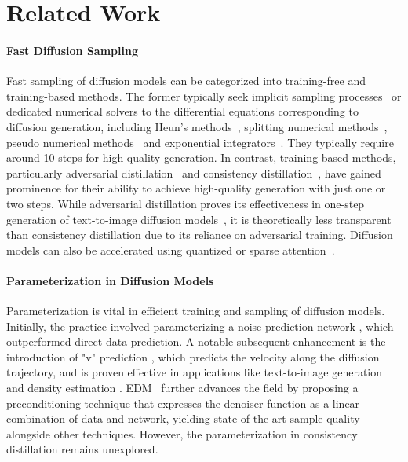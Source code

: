 \section{Related Work}
\paragraph{Fast Diffusion Sampling} Fast sampling of diffusion models can be categorized into training-free and training-based methods. The former typically seek implicit sampling processes~\citep{song2020denoising,zheng2024masked,zheng2024diffusion} or dedicated numerical solvers to the differential equations corresponding to diffusion generation, including Heun's methods~\citep{karras2022elucidating}, splitting numerical methods~\citep{wizadwongsa2023accelerating}, pseudo numerical methods~\citep{liu2021pseudo} and exponential integrators~\citep{zhang2022fast,lu2022dpm,zheng2023dpm,gonzalez2023seeds}. They typically require around 10 steps for high-quality generation. In contrast, training-based methods, particularly adversarial distillation~\citep{sauer2023adversarial} and consistency distillation~\citep{song2023consistency,kim2023consistency}, have gained prominence for their ability to achieve high-quality generation with just one or two steps. While adversarial distillation proves its effectiveness in one-step generation of text-to-image diffusion models~\citep{sauer2024fast}, it is theoretically less transparent than consistency distillation due to its reliance on adversarial training. Diffusion models can also be accelerated using quantized or sparse attention~\citep{zhang2025sageattention,zhang2024sageattention2,zhang2025spargeattn}.
\paragraph{Parameterization in Diffusion Models} 
Parameterization is vital in efficient training and sampling of diffusion models. Initially, the practice involved parameterizing a noise prediction network \citep{ho2020denoising,song2020score}, which outperformed direct data prediction. A notable subsequent enhancement is the introduction of "v" prediction \citep{salimans2022progressive}, which predicts the velocity along the diffusion trajectory, and is proven effective in applications like text-to-image generation \citep{esser2024scaling} and density estimation \citep{zheng2023improved}. EDM~\citep{karras2022elucidating} further advances the field by proposing a preconditioning technique that expresses the denoiser function as a linear combination of data and network, yielding state-of-the-art sample quality alongside other techniques. However, the parameterization in consistency distillation remains unexplored.